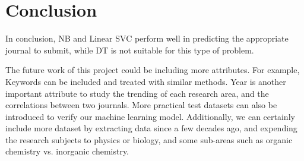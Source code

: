 \documentclass[conference]{IEEEtran}
\begin{document}
\section{Conclusion}
In conclusion, NB and Linear SVC perform well in predicting the appropriate journal to submit, while DT is not suitable for this type of problem.

The future work of this project could be including more attributes. For example, Keywords can be included and treated with similar methods. Year is another important attribute to study the trending of each research area, and the correlations between two journals. More practical test datasets can also be introduced to verify our machine learning model. Additionally, we can certainly include more dataset by extracting data since a few decades ago, and expending the research subjects to physics or biology, and some sub-areas such as organic chemistry vs. inorganic chemistry.










%
%
%




\end{document}
